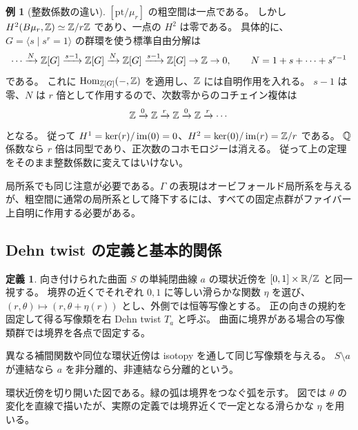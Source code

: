 \documentclass[dvipdfmx,a4paper,11pt]{article}
\theoremstyle{definition}
\newtheorem{dfn}[thm]{定義}
\newtheorem{exa}[thm]{例}
\begin{document}
\begin{exa}[整数係数の違い]
$[\mathrm{pt}/\mu_r]$ の粗空間は一点である。
しかし $H^2(B\mu_r,\mathbb Z)\simeq\mathbb Z/r\mathbb Z$ であり、一点の $H^2$ は零である。
具体的に、$G=\langle s\mid s^r=1\rangle$ の群環を使う標準自由分解は
\[
\cdots\xrightarrow{N}\mathbb Z[G]\xrightarrow{s-1}\mathbb Z[G]
\xrightarrow{N}\mathbb Z[G]\xrightarrow{s-1}\mathbb Z[G]\to\mathbb Z\to0,
\qquad N=1+s+\cdots+s^{r-1}
\]
である。
これに $\operatorname{Hom}_{\mathbb Z[G]}(-,\mathbb Z)$ を適用し、$\mathbb Z$ には自明作用を入れる。
$s-1$ は零、$N$ は $r$ 倍として作用するので、次数零からのコチェイン複体は
\[
\mathbb Z\xrightarrow{0}\mathbb Z\xrightarrow{r}\mathbb Z\xrightarrow{0}\mathbb Z\xrightarrow{r}\cdots
\]
となる。
従って $H^1=\ker(r)/\operatorname{im}(0)=0$、$H^2=\ker(0)/\operatorname{im}(r)=\mathbb Z/r$ である。
$\mathbb Q$ 係数なら $r$ 倍は同型であり、正次数のコホモロジーは消える。
従って上の定理をそのまま整数係数に変えてはいけない。
\end{exa}
局所系でも同じ注意が必要である。$\Gamma$ の表現はオービフォールド局所系を与えるが、粗空間に通常の局所系として降下するには、すべての固定点群がファイバー上自明に作用する必要がある。

\subsection{Dehn twist の定義と基本的関係}
\begin{dfn}
向き付けられた曲面 $S$ の単純閉曲線 $a$ の環状近傍を $[0,1]\times\mathbb R/\mathbb Z$ と同一視する。
境界の近くでそれぞれ $0,1$ に等しい滑らかな関数 $\eta$ を選び、
$(r,\theta)\mapsto(r,\theta+\eta(r))$ とし、外側では恒等写像とする。
正の向きの規約を固定して得る写像類を右 Dehn twist $T_a$ と呼ぶ。
曲面に境界がある場合の写像類群では境界を各点で固定する。
\end{dfn}
異なる補間関数や同位な環状近傍は isotopy を通して同じ写像類を与える。
$S\setminus a$ が連結なら $a$ を非分離的、非連結なら分離的という。
\par\medskip
\noindent\begin{minipage}{\linewidth}
\begin{center}
\end{center}
環状近傍を切り開いた図である。緑の弧は境界をつなぐ弧を示す。
図では $\theta$ の変化を直線で描いたが、実際の定義では境界近くで一定となる滑らかな $\eta$ を用いる。
\end{minipage}\par\medskip
\end{document}
